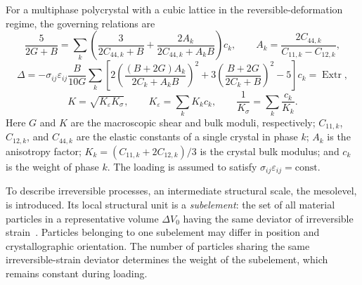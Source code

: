 \documentclass[11pt,a4paper]{article}
\numberwithin{equation}{section}
\newcommand{\Extr}{\operatorname{Extr}}
\begin{document}
For a multiphase polycrystal with a cubic lattice in the reversible-deformation regime, the governing relations are
\begin{equation}
 \frac{5}{2G+B}
 =\sum_k\left(
    \frac{3}{2C_{44,k}+B}
   +\frac{2A_k}{2C_{44,k}+A_kB}
  \right)c_k,
 \qquad
 A_k=\frac{2C_{44,k}}{C_{11,k}-C_{12,k}},
\end{equation}
\begin{equation}
 \Delta
 =-\sigma_{ij}\varepsilon_{ij}\frac{B}{10G}
 \sum_k\left[
  2\left(\frac{(B+2G)A_k}{2C_k+A_kB}\right)^2
 +3\left(\frac{B+2G}{2C_k+B}\right)^2-5
 \right]c_k
 =\Extr,
\end{equation}
\begin{equation}
 K=\sqrt{K_\varepsilon K_\sigma},
 \qquad
 K_\varepsilon=\sum_k K_kc_k,
 \qquad
 \frac{1}{K_\sigma}=\sum_k\frac{c_k}{K_k}.
\end{equation}
Here $G$ and $K$ are the macroscopic shear and bulk moduli, respectively; $C_{11,k}$, $C_{12,k}$, and $C_{44,k}$ are the elastic constants of a single crystal in phase $k$; $A_k$ is the anisotropy factor; $K_k=(C_{11,k}+2C_{12,k})/3$ is the crystal bulk modulus; and $c_k$ is the weight of phase $k$. The loading is assumed to satisfy $\sigma_{ij}\varepsilon_{ij}=\text{const}$.

To describe irreversible processes, an intermediate structural scale, the mesolevel, is introduced. Its local structural unit is a \emph{subelement}: the set of all material particles in a representative volume $\Delta V_0$ having the same deviator of irreversible strain~\cite{shevchenko1976,shevchenko1992,marina2024}. Particles belonging to one subelement may differ in position and crystallographic orientation. The number of particles sharing the same irreversible-strain deviator determines the weight of the subelement, which remains constant during loading.
\end{document}
